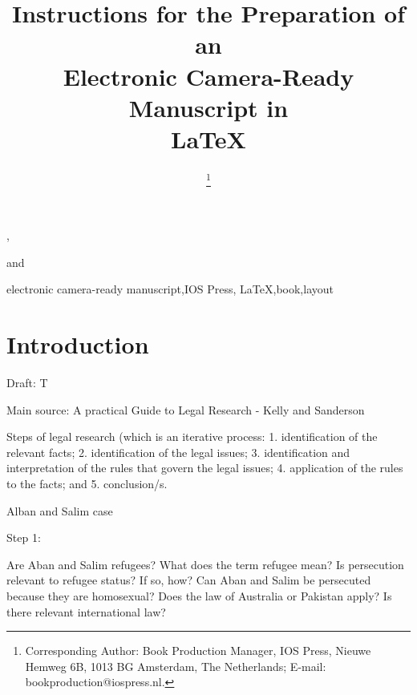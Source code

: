 \documentclass{IOS-Book-Article}
\begin{document}
\begin{frontmatter}              %

\title{Instructions for the Preparation of an\\
Electronic Camera-Ready Manuscript in\\ \LaTeX}

\author[A]{ %
\thanks{Corresponding Author: Book Production Manager, IOS Press, Nieuwe Hemweg 6B,
1013 BG Amsterdam, The Netherlands; E-mail:
bookproduction@iospress.nl.}},
\author[B]{ }
and
\author[B]{ }

\address[A]{Book Production Department, IOS Press, The Netherlands}
\address[B]{Short Affiliation of Second Author and Third Author}

\begin{abstract}

\end{abstract}

\begin{keyword}
electronic camera-ready manuscript\sep IOS Press\sep
\LaTeX\sep book\sep layout
\end{keyword}
\end{frontmatter}

\thispagestyle{empty}
\pagestyle{empty}

\section{Introduction}

Draft: T

Main source: A practical Guide to Legal Research - Kelly and Sanderson

Steps of legal research (which is an iterative process:
1. identification of the relevant facts;
2. identification of the legal issues;
3. identification and interpretation of the rules that govern the legal issues;
4. application of the rules to the facts; and
5. conclusion/s.

Alban and Salim case

Step 1:

Are Aban and Salim refugees? What does the term refugee mean?
Is persecution relevant to refugee status? If so, how?
Can Aban and Salim be persecuted because they are homosexual?
Does the law of Australia or Pakistan apply?
Is there relevant international law?
\end{document}
